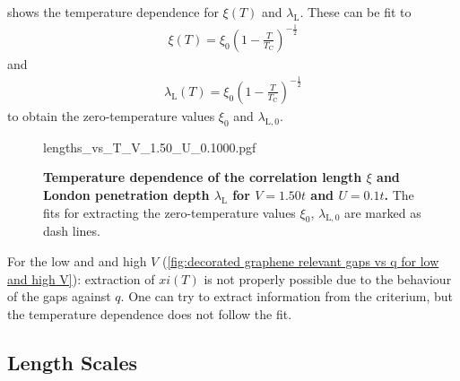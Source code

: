 \documentclass[../notes.tex]{subfiles}
\begin{document}
 shows the temperature dependence for \(\xi (T)\) and \(\lambda_{\mathrm{L}}\).
These can be fit to
\begin{align}
	\xi(T) = \xi_0 \left(1 - \frac{T}{T_{\mathrm{C}}}\right)^{-\frac{1}{2}}
\end{align}
and
\begin{align}
	\lambda_{\mathrm{L}} (T) = 	\xi_0 \left(1 - \frac{T}{T_{\mathrm{C}}}\right)^{-\frac{1}{2}}
\end{align}
to obtain the zero-temperature values \(\xi_0\) and \(\lambda_{\mathrm{L}, 0}\).
\begin{figure}[tb]
	\centering
	{lengths_vs_T_V_1.50_U_0.1000.pgf}
	\caption[Temperature dependence of the correlation length \(\xi\) and London penetration depth \(\lambda_{\mathrm{L}}\) for \(V = 1.50t\) and \(U  = 0.1t\).]{\textbf{Temperature dependence of the correlation length \(\xi\) and London penetration depth \(\lambda_{\mathrm{L}}\) for \(V = 1.50t\) and \(U  = 0.1t\).} The fits for extracting the zero-temperature values \(\xi_0\), \(\lambda_{\mathrm{L}, 0}\) are marked as dash lines.}
	\label{fig:decorated graphene temperature fits for xi and lambda}
\end{figure}
For the low and and high \(V\) (\cref{fig:decorated graphene relevant gaps vs q for low and high V}): extraction of \(xi (T)\) is not properly possible due to the behaviour of the gaps against \(q\).
One can try to extract information from the criterium, but the temperature dependence does not follow the fit. 


\subsection*{Length Scales}
\end{document}
